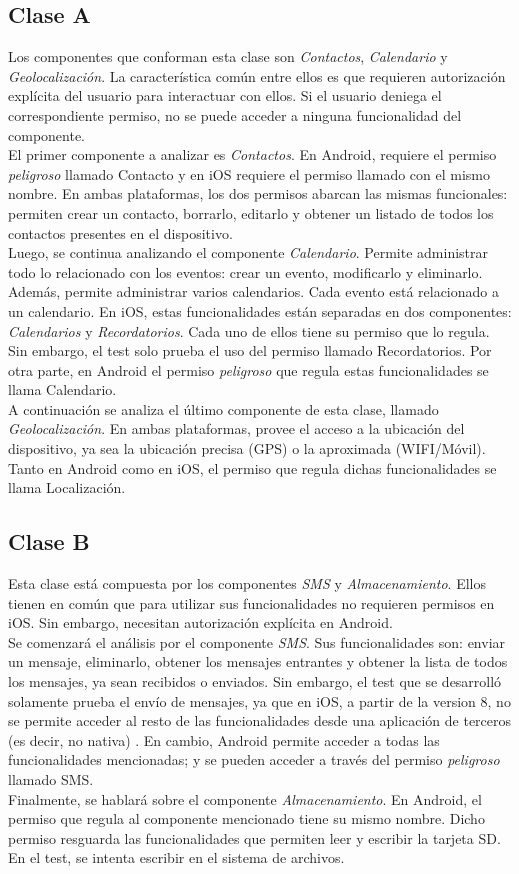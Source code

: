 \subsection{Clase A}
Los componentes que conforman esta clase son \emph{Contactos}, \emph{Calendario} y \emph{Geolocalización}. La característica común entre ellos es que requieren autorización explícita del usuario para interactuar con ellos. Si el usuario deniega el correspondiente permiso, no se puede acceder a ninguna funcionalidad del componente.\\
El primer componente a analizar es \emph{Contactos}. En Android, requiere el permiso \textit{peligroso} llamado Contacto y en iOS requiere el permiso llamado con el mismo nombre. En ambas plataformas, los dos permisos abarcan las mismas funcionales: permiten crear un contacto, borrarlo, editarlo y obtener un listado de todos los contactos presentes en el dispositivo.\\
Luego, se continua analizando el componente \emph{Calendario}. Permite administrar todo lo relacionado con los eventos: crear un evento, modificarlo y eliminarlo. Además, permite administrar varios calendarios. Cada evento está relacionado a un calendario. En iOS, estas funcionalidades están separadas en dos componentes: \emph{Calendarios} y \emph{Recordatorios}. Cada uno de ellos tiene su permiso que lo regula. Sin embargo, el test solo prueba el uso del permiso llamado Recordatorios. Por otra parte, en Android el permiso \textit{peligroso} que regula estas funcionalidades se llama Calendario.\\
A continuación se analiza el último componente de esta clase, llamado \emph{Geolocalización}. En ambas plataformas, provee el acceso a la ubicación del dispositivo, ya sea la ubicación precisa (GPS) o la aproximada (WIFI/Móvil). Tanto en Android como en iOS, el permiso que regula dichas funcionalidades se llama Localización.\\
\subsection{Clase B}
Esta clase está compuesta por los componentes \emph{SMS} y \emph{Almacenamiento}. Ellos tienen en común que para utilizar sus funcionalidades no requieren permisos en iOS. Sin embargo, necesitan autorización explícita en Android.\\
Se comenzará el análisis por el componente \emph{SMS}. Sus funcionalidades son: enviar un mensaje, eliminarlo, obtener los mensajes entrantes y obtener la lista de todos los mensajes, ya sean recibidos o enviados. Sin embargo, el test que se desarrolló solamente prueba el envío de mensajes, ya que en iOS, a partir de la version 8, no se permite acceder al resto de las funcionalidades desde una aplicación de terceros (es decir, no nativa) \cite{foda, foda2}. En cambio, Android permite acceder a todas las funcionalidades mencionadas; y se pueden acceder a través del permiso \textit{peligroso} llamado SMS.\\
Finalmente, se hablará sobre el componente \emph{Almacenamiento}. En Android, el permiso que regula al componente mencionado tiene su mismo nombre. Dicho permiso resguarda las funcionalidades que permiten leer y escribir la tarjeta SD. En el test, se intenta escribir en el sistema de archivos.
